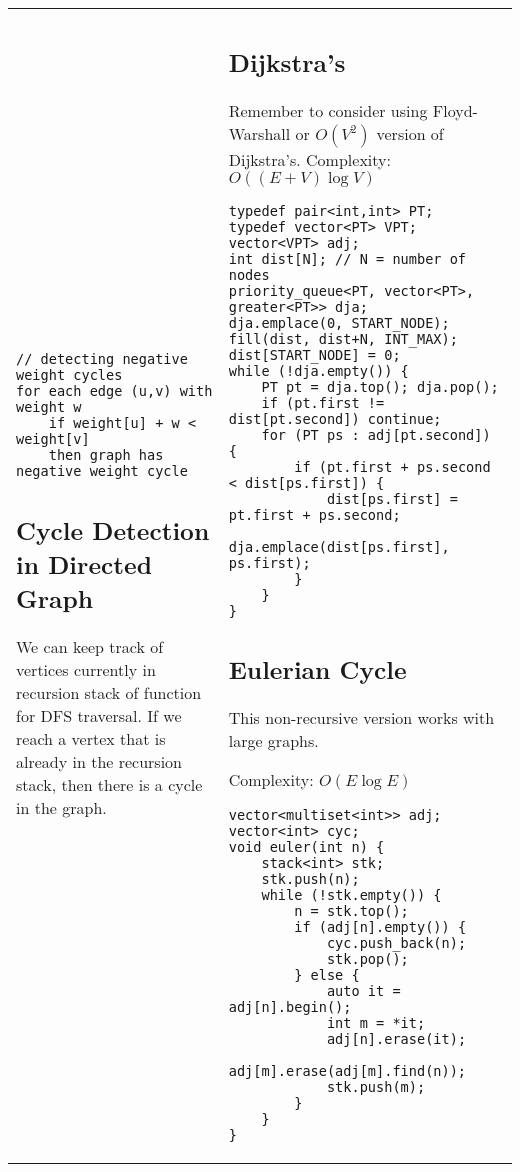 \documentclass[letterpaper]{article}
\begin{document}
\begin{tabular}{@{}p{9cm}p{9cm}@{}}
\begin{lstlisting}
// detecting negative weight cycles
for each edge (u,v) with weight w
	if weight[u] + w < weight[v]
	then graph has negative weight cycle
\end{lstlisting}


    \subsection{Cycle Detection in Directed Graph}

    We can keep track of vertices currently in recursion stack of function for DFS traversal. If we reach a vertex that is already in the recursion stack, then there is a cycle in the graph.
     &
    \subsection{Dijkstra's}

    Remember to consider using Floyd-Warshall or $O\left(V^2\right)$ version of Dijkstra's. Complexity: $O\left(\left(E+V\right)\log V\right)$

    \begin{lstlisting}
typedef pair<int,int> PT;
typedef vector<PT> VPT;
vector<VPT> adj;
int dist[N]; // N = number of nodes
priority_queue<PT, vector<PT>, greater<PT>> dja;
dja.emplace(0, START_NODE);
fill(dist, dist+N, INT_MAX);
dist[START_NODE] = 0;
while (!dja.empty()) {
	PT pt = dja.top(); dja.pop();
	if (pt.first != dist[pt.second]) continue;
	for (PT ps : adj[pt.second]) {
		if (pt.first + ps.second < dist[ps.first]) {
			dist[ps.first] = pt.first + ps.second;
			dja.emplace(dist[ps.first], ps.first);
		}
	}
}
\end{lstlisting}

    \subsection{Eulerian Cycle}

    This non-recursive version works with large graphs.

    Complexity: $O(E\log E)$

    \begin{lstlisting}
vector<multiset<int>> adj;
vector<int> cyc;
void euler(int n) {
	stack<int> stk;
	stk.push(n);
	while (!stk.empty()) {
		n = stk.top();
		if (adj[n].empty()) {
			cyc.push_back(n);
			stk.pop();
		} else {
			auto it = adj[n].begin();
			int m = *it;
			adj[n].erase(it);
			adj[m].erase(adj[m].find(n));
			stk.push(m);
		}
	}
}
\end{lstlisting}


\end{tabular}
\end{document}
